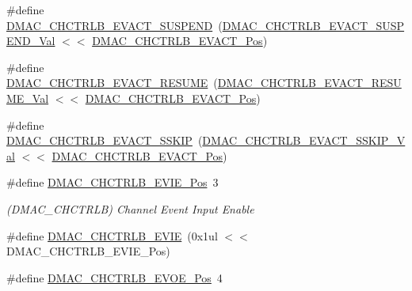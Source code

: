 \begin{DoxyCompactItemize}
\item 
\#define \mbox{\hyperlink{group___s_a_m_d21___d_m_a_c_ga73058a9110042dba77ec380835175d31}{D\+M\+A\+C\+\_\+\+C\+H\+C\+T\+R\+L\+B\+\_\+\+E\+V\+A\+C\+T\+\_\+\+S\+U\+S\+P\+E\+ND}}~(\mbox{\hyperlink{group___s_a_m_d21___d_m_a_c_gacb1322d1f22aee0ec2daecb1c51dbbc4}{D\+M\+A\+C\+\_\+\+C\+H\+C\+T\+R\+L\+B\+\_\+\+E\+V\+A\+C\+T\+\_\+\+S\+U\+S\+P\+E\+N\+D\+\_\+\+Val}} $<$$<$ \mbox{\hyperlink{group___s_a_m_d21___d_m_a_c_ga5d582eee4f8e2bfd97709b103da6830e}{D\+M\+A\+C\+\_\+\+C\+H\+C\+T\+R\+L\+B\+\_\+\+E\+V\+A\+C\+T\+\_\+\+Pos}})
\item 
\#define \mbox{\hyperlink{group___s_a_m_d21___d_m_a_c_ga142282abf36b287ab0f7ebc4f4d9e4c3}{D\+M\+A\+C\+\_\+\+C\+H\+C\+T\+R\+L\+B\+\_\+\+E\+V\+A\+C\+T\+\_\+\+R\+E\+S\+U\+ME}}~(\mbox{\hyperlink{group___s_a_m_d21___d_m_a_c_ga7356b082779dc3467dd5003f8ed8c01b}{D\+M\+A\+C\+\_\+\+C\+H\+C\+T\+R\+L\+B\+\_\+\+E\+V\+A\+C\+T\+\_\+\+R\+E\+S\+U\+M\+E\+\_\+\+Val}} $<$$<$ \mbox{\hyperlink{group___s_a_m_d21___d_m_a_c_ga5d582eee4f8e2bfd97709b103da6830e}{D\+M\+A\+C\+\_\+\+C\+H\+C\+T\+R\+L\+B\+\_\+\+E\+V\+A\+C\+T\+\_\+\+Pos}})
\item 
\#define \mbox{\hyperlink{group___s_a_m_d21___d_m_a_c_ga3a7bfa7bd0e91711566d3a12f150f678}{D\+M\+A\+C\+\_\+\+C\+H\+C\+T\+R\+L\+B\+\_\+\+E\+V\+A\+C\+T\+\_\+\+S\+S\+K\+IP}}~(\mbox{\hyperlink{group___s_a_m_d21___d_m_a_c_ga30fe7c169fb72d0ba2f073769858069a}{D\+M\+A\+C\+\_\+\+C\+H\+C\+T\+R\+L\+B\+\_\+\+E\+V\+A\+C\+T\+\_\+\+S\+S\+K\+I\+P\+\_\+\+Val}}  $<$$<$ \mbox{\hyperlink{group___s_a_m_d21___d_m_a_c_ga5d582eee4f8e2bfd97709b103da6830e}{D\+M\+A\+C\+\_\+\+C\+H\+C\+T\+R\+L\+B\+\_\+\+E\+V\+A\+C\+T\+\_\+\+Pos}})
\item 
\#define \mbox{\hyperlink{group___s_a_m_d21___d_m_a_c_ga770e9e8df9e5ffa4dbfcbe1bf0e1aca1}{D\+M\+A\+C\+\_\+\+C\+H\+C\+T\+R\+L\+B\+\_\+\+E\+V\+I\+E\+\_\+\+Pos}}~3
\begin{DoxyCompactList}\small\item\em (D\+M\+A\+C\+\_\+\+C\+H\+C\+T\+R\+LB) Channel Event Input Enable \end{DoxyCompactList}\item 
\#define \mbox{\hyperlink{group___s_a_m_d21___d_m_a_c_gacca87f7096b07b0b8b47af8cee7a82d8}{D\+M\+A\+C\+\_\+\+C\+H\+C\+T\+R\+L\+B\+\_\+\+E\+V\+IE}}~(0x1ul $<$$<$ D\+M\+A\+C\+\_\+\+C\+H\+C\+T\+R\+L\+B\+\_\+\+E\+V\+I\+E\+\_\+\+Pos)
\item 
\#define \mbox{\hyperlink{group___s_a_m_d21___d_m_a_c_gae44638b8cd2719d74b47ac7d6466574a}{D\+M\+A\+C\+\_\+\+C\+H\+C\+T\+R\+L\+B\+\_\+\+E\+V\+O\+E\+\_\+\+Pos}}~4

\end{DoxyCompactItemize}
